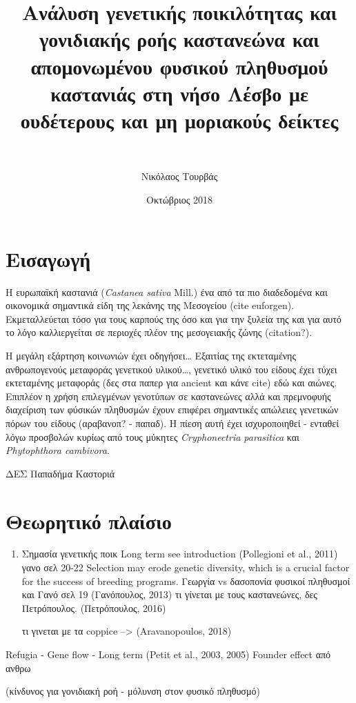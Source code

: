 \documentclass[12pt,a4paper,]{report}
\title{Ανάλυση γενετικής ποικιλότητας και γονιδιακής ροής καστανεώνα και
απομονωμένου φυσικού πληθυσμού καστανιάς στη νήσο Λέσβο με ουδέτερους
και μη μοριακούς δείκτες}
\subtitle{~}
\author{Νικόλαος Τουρβάς}
\date{Οκτώβριος 2018}
\begin{document}
\maketitle

\section{Εισαγωγή}

Η ευρωπαϊκή καστανιά (\emph{Castanea sativa} Mill.) ένα από τα πιο
διαδεδομένα και οικονομικά σημαντικά είδη της λεκάνης της Μεσογείου
(cite euforgen). Εκμεταλλεύεται τόσο για τους καρπούς της όσο και για
την ξυλεία της και για αυτό το λόγο καλλιεργείται σε περιοχές πλέον της
μεσογειακής ζώνης (citation?).

Η μεγάλη εξάρτηση κοινωνιών έχει οδηγήσει\ldots{} Εξαιτίας της
εκτεταμένης ανθρωπογενούς μεταφοράς γενετικού υλικού\ldots{}, γενετικό
υλικό του είδους έχει τύχει εκτεταμένης μεταφοράς (δες στα παπερ για
ancient και κάνε cite) εδώ και αιώνες. Επιπλέον η χρήση επιλεγμένων
γενοτύπων σε καστανεώνες αλλά και πρεμνοφυής διαχείριση των φύσικών
πληθυσμών έχουν επιφέρει σημαντικές απώλειες γενετικών πόρων του είδους
(αραβανοπ? - παπαδ). Η πίεση αυτή έχει ισχυροποιηθεί - ενταθεί λόγω
προσβολών κυρίως από τους μύκητες \emph{Cryphonectria parasitica} και
\emph{Phytophthora cambivora}.

ΔΕΣ Παπαδήμα Καστοριά

\hypertarget{-}{%
\section{Θεωρητικό πλαίσιο}\label{-}}

\begin{enumerate}
\def\labelenumi{\arabic{enumi}.}
\item
  Σημασία γενετικής ποικ Long term see introduction (Pollegioni et al.,
  2011) γανο σελ 20-22 Selection may erode genetic diversity, which is a
  crucial factor for the success of breeding programs. Γεωργία vs
  δασοπονία φυσικοί πληθυσμοί και Γανό σελ 19 (Γανόπουλος, 2013) τι
  γίνεται με τους καστανεώνες, δες Πετρόπουλος. (Πετρόπουλος, 2016)

  τι γινεται με τα coppice --\textgreater{} (Aravanopoulos, 2018)
\end{enumerate}

Refugia - Gene flow - Long term (Petit et al., 2003, 2005) Founder
effect από ανθρω

(κίνδυνος για γονιδιακή ροή - μόλυνση στον φυσικό πληθυσμό)
\end{document}
